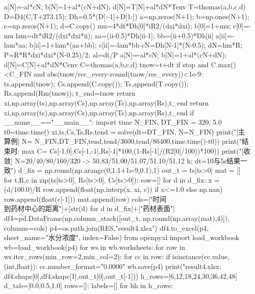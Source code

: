 \begin{codelisting}
        a[N]=-al*cN; b[N]=1+al*(cN+dN); d[N]=T[N]+al*dN*Tenv
        T=thomas(a,b,c,d)
        D=D4(C,T+273.15); Dh=0.5*(D[:-1]+D[1:])
        a=np.zeros(N+1); b=np.ones(N+1); c=np.zeros(N+1); d=C.copy()
        mu=4*dt*Dh[0]*iR2/(dxi*dxi); b[0]=1+mu; c[0]=-mu
        lam=dt*iR2/(dxi*dxi*ii); aa=(ii-0.5)*Dh[ii-1]; bb=(ii+0.5)*Dh[ii]
        a[ii]=-lam*aa; b[ii]=1+lam*(aa+bb); c[ii]=-lam*bb
        cN=Dh[N-1]*(N-0.5); dN=hm*R; P=R*R*dxi*dxi*(N-0.25)/2; al=dt/P
        a[N]=-al*cN; b[N]=1+al*(cN+dN); d[N]=C[N]+al*dN*Cenv
        C=thomas(a,b,c,d)
        tnow=t+dt
        if stop and C.max()<C_FIN and abs(tnow/rec_every-round(tnow/rec_every))<1e-9:
            ts.append(tnow); Cs.append(C.copy()); Ts.append(T.copy()); Rs.append(Rm(tnow)); t_end=tnow
            return xi,np.array(ts),np.array(Cs),np.array(Ts),np.array(Rs),t_end
    return xi,np.array(ts),np.array(Cs),np.array(Ts),np.array(Rs),t_end
if __name__=="__main__":
    import time
    N_FIN, DT_FIN = 320, 5.0
    t0=time.time()
    xi,ts,Cs,Ts,Rs,tend = solve(dt=DT_FIN, N=N_FIN)
    print("[主算例] N=%
        N_FIN,DT_FIN,tend,tend/3600,tend/86400,time.time()-t0))
    print("结束时: max C=%
        Cs[-1,0],Cs[-1,-1],Rs[-1]*100,(1-Rs[-1]/(R2[0]/100))*100))
    print("[收敛] N=20/40/80/160/320 -> 50.83/51.00/51.07/51.10/51.12 h; dt=10与5s结果一致")
    d_fix = np.round(np.arange(0,1.1+1e-9,0.1),1)
    out_t = ts[ts>0]
    mat = []
    for t,R,c in zip(ts[ts>0], Rs[ts>0], Cs[ts>0]):
        row=[]
        for d in d_fix:
            x = (d/100.0)/R
            row.append(float(np.interp(x, xi, c)) if x<=1.0 else np.nan)
        row.append(float(c[-1]))
        mat.append(row)
    cols=["时间\\到药材中心的距离"]+[str(d) for d in d_fix]+["药材表面"]
    df4=pd.DataFrame(np.column_stack([out_t, np.round(np.array(mat),4)]), columns=cols)
    p4=os.path.join(RES,"result4.xlsx")
    df4.to_excel(p4, sheet_name="水分浓度", index=False)
    from openpyxl import load_workbook
    wb=load_workbook(p4)
    for ws in wb.worksheets:
        for row in ws.iter_rows(min_row=2,min_col=2):
            for cc in row:
                if isinstance(cc.value,(int,float)): cc.number_format="0.0000"
    wb.save(p4)
    print("result4.xlsx: %
        df4.shape[0],df4.shape[1],out_t[0],out_t[-1]))
    h_rows=[6,12,18,24,30,36,42,48]
    d_tab=[0.0,0.5,1.0]
    rows=[]; labels=[]
    for hh in h_rows:

\end{codelisting}
